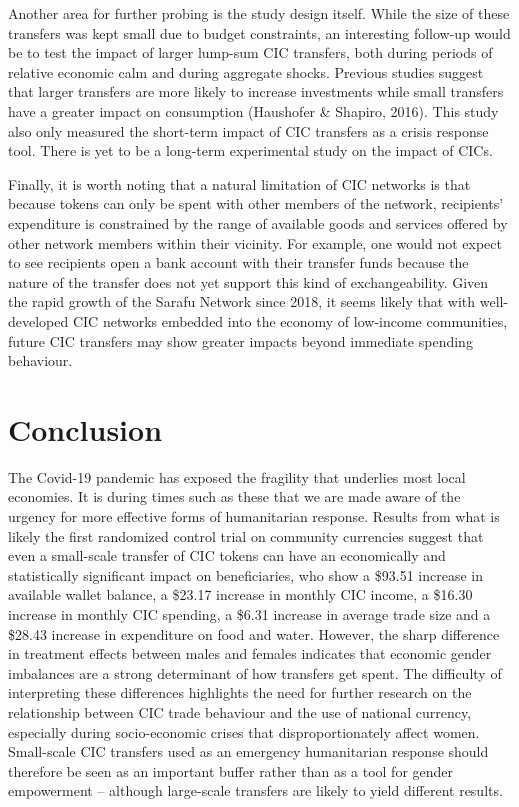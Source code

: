 \documentclass[12pt]{article}
\begin{document}
Another area for further probing is the study design itself. While the size of these transfers was kept small due to budget constraints, an interesting follow-up would be to test the impact of larger lump-sum CIC transfers, both during periods of relative economic calm and during aggregate shocks. Previous studies suggest that larger transfers are more likely to increase investments while small transfers have a greater impact on consumption (Haushofer \& Shapiro, 2016). This study also only measured the short-term impact of CIC transfers as a crisis response tool. There is yet to be a long-term experimental study on the impact of CICs.

Finally, it is worth noting that a natural limitation of CIC networks is that because tokens can only be spent with other members of the network, recipients’ expenditure is constrained by the range of available goods and services offered by other network members within their vicinity. For example, one would not expect to see recipients open a bank account with their transfer funds because the nature of the transfer does not yet support this kind of exchangeability. Given the rapid growth of the Sarafu Network since 2018, it seems likely that with well-developed CIC networks embedded into the economy of low-income communities, future CIC transfers may show greater impacts beyond immediate spending behaviour.


\section{Conclusion}
\label{sec:section8}
The Covid-19 pandemic has exposed the fragility that underlies most local economies. It is during times such as these that we are made aware of the urgency for more effective forms of humanitarian response. Results from what is likely the first randomized control trial on community currencies suggest that even a small-scale transfer of CIC tokens can have an economically and statistically significant impact on beneficiaries, who show a \$93.51 increase in available wallet balance, a \$23.17 increase in monthly CIC income, a \$16.30 increase in monthly CIC spending, a \$6.31 increase in average trade size and a \$28.43 increase in expenditure on food and water. However, the sharp difference in treatment effects between males and females indicates that economic gender imbalances are a strong determinant of how transfers get spent. The difficulty of interpreting these differences highlights the need for further research on the relationship between CIC trade behaviour and the use of national currency, especially during socio-economic crises that disproportionately affect women. Small-scale CIC transfers used as an emergency humanitarian response should therefore be seen as an important buffer rather than as a tool for gender empowerment – although large-scale transfers are likely to yield different results.
\end{document}
